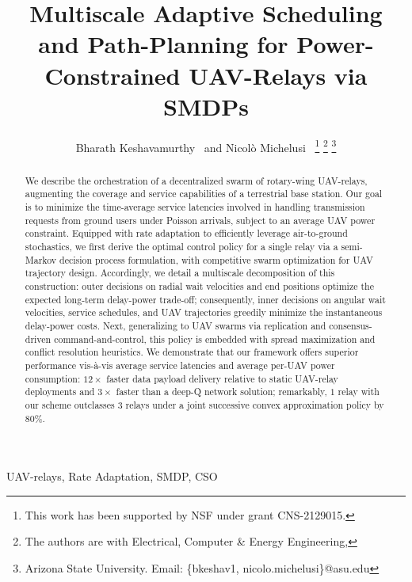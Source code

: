 \documentclass[10pt,twocolumn]{IEEEtran}
\title{Multiscale Adaptive Scheduling and Path-Planning for Power-Constrained UAV-Relays via SMDPs}
\author{Bharath Keshavamurthy~\IEEEmembership{Student Member, IEEE} and Nicol\`{o} Michelusi~\IEEEmembership{Senior Member, IEEE}
\thanks{This work has been supported by NSF under grant CNS-2129015.}
\thanks{The authors are with Electrical, Computer \& Energy Engineering,}
\thanks{Arizona State University. Email: \{bkeshav1, nicolo.michelusi\}@asu.edu}
\vspace{-10mm}}
\begin{document}
\maketitle
\thispagestyle{empty}
\pagestyle{empty}
\newcommand{\linespreadexceptabstractandindex}{\setstretch{0.98}}
\newcommand{\linespreadforabstractandindex}{\setstretch{0.991}}
\newcommand{\extraspacebeforesec}{-4mm}
\newcommand{\extraspacebeforesubsubsec}{0.2mm}
\linespreadexceptabstractandindex

\begin{abstract}
We describe the orchestration of a decentralized swarm of rotary-wing UAV-relays, augmenting the coverage and service capabilities of a terrestrial base station. Our goal is to minimize the time-average service latencies involved in handling transmission requests from ground users under Poisson arrivals, subject to an average UAV power constraint. Equipped with rate adaptation to efficiently leverage air-to-ground stochastics, we first derive the optimal control policy for a single relay via a semi-Markov decision process formulation, with competitive swarm optimization for UAV trajectory design. Accordingly, we detail a multiscale decomposition of this construction: outer decisions on radial wait velocities and end positions optimize the expected long-term delay-power trade-off; consequently, inner decisions on angular wait velocities, service schedules, and UAV trajectories greedily minimize the instantaneous delay-power costs. Next, generalizing to UAV swarms via replication and consensus-driven command-and-control, this policy is embedded with spread maximization and conflict resolution heuristics. We demonstrate that our framework offers superior performance vis-à-vis average service latencies and average per-UAV power consumption: $12\times$ faster data payload delivery relative to static UAV-relay deployments and $3\times$ faster than a deep-Q network solution; remarkably, $1$ relay with our scheme outclasses $3$ relays under a joint successive convex approximation policy by $80$\%.
\end{abstract}

\begin{IEEEkeywords}
  UAV-relays, Rate Adaptation, SMDP, CSO
\end{IEEEkeywords}

\glsresetall

\vspace{-4mm}
\end{document}
